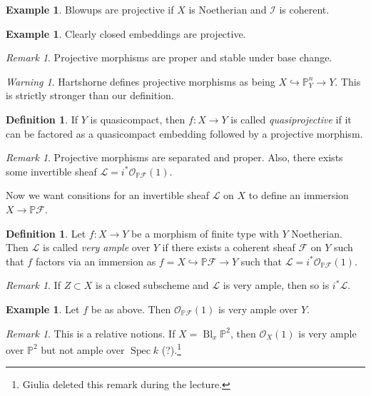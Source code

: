 \documentclass[leqno, openany]{memoir}
\theoremstyle{definition}
\newtheorem{defn}[thm]{Definition}
\newtheorem{exm}[thm]{Example}
\theoremstyle{remark}
\newtheorem{rmk}[thm]{Remark}
\newtheorem{warn}[thm]{Warning}
\theoremstyle{plain}
\theoremstyle{definition}
\theoremstyle{remark}
\renewcommand{\P}{\mathbb{P}}
\newcommand{\mc}[1]{\mathcal{#1}}
\DeclareMathOperator{\Spec}{Spec}
\DeclareMathOperator{\Bl}{Bl}
\begin{document}
\begin{exm}
    Blowups are projective if $X$ is Noetherian and $\mc{I}$ is coherent.
\end{exm}

\begin{exm}
    Clearly closed embeddings are projective.
\end{exm}

\begin{rmk}
    Projective morphisms are proper and stable under base change.
\end{rmk}

\begin{warn}
    Hartshorne defines projective morphisms as being $X \hookrightarrow \P^n_Y \to Y$. This is strictly stronger than our definition.
\end{warn}

\begin{defn}
    If $Y$ is quasicompact, then $f \colon X \to Y$ is called \textit{quasiprojective} if it can be factored as a quasicompact embedding followed by a projective morphism.
\end{defn}

\begin{rmk}
    Projective morphisms are separated and proper. Also, there exists some invertible sheaf $\mc{L} = i^* \mc{O}_{\P \mc{F}}(1)$.
\end{rmk}

Now we want consitions for an invertible sheaf $\mc{L}$ on $X$ to define an immersion $X \to \P \mc{F}$.

\begin{defn}
    Let $f \colon X \to Y$ be a morphism of finite type with $Y$ Noetherian. Then $\mc{L}$ is called \textit{very ample} over $Y$ if there exists a coherent sheaf $\mc{F}$ on $Y$ such that $f$ factors via an immersion as $f = X \hookrightarrow \P \mc{F} \to Y$ such that $\mc{L} = i^* \mc{O}_{\P \mc{F}}(1)$.
\end{defn}

\begin{rmk}
    If $Z \subset X$ is a closed subscheme and $\mc{L}$ is very ample, then so is $i^* \mc{L}$.
\end{rmk}

\begin{exm}
    Let $f$ be as above. Then $\mc{O}_{\P \mc{F}}(1)$ is very ample over $Y$.
\end{exm}

\begin{rmk}
    This is a relative notions. If $X = \Bl_x \P^2$, then $\mc{O}_X(1)$ is very ample over $\P^2$ but not ample over $\Spec k$ (?).\footnote{Giulia deleted this remark during the lecture.}
\end{rmk}
\end{document}
